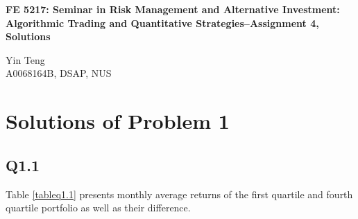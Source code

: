 \documentclass[11pt]{article}
\begin{document}
\textbf{\Large FE 5217: Seminar in Risk Management and Alternative Investment: Algorithmic Trading and Quantitative Strategies--Assignment 4, Solutions}
\begin{center}
Yin Teng\\
A0068164B, DSAP, NUS
\end{center}
\section{Solutions of Problem 1}
\subsection{Q1.1}
Table \ref{tableq1.1} presents monthly average returns of the first quartile and fourth quartile portfolio as well as their difference. 
\end{document}

